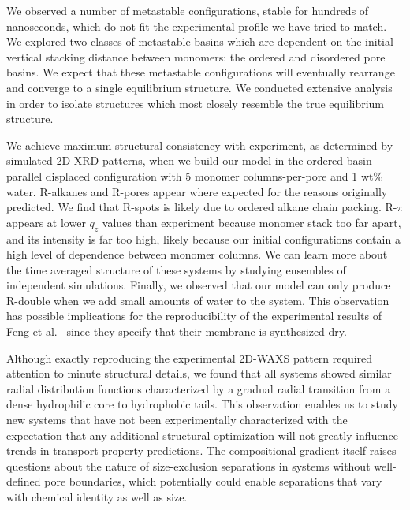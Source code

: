   We observed a number of metastable configurations, stable for hundreds of 
  nanoseconds, which do not fit the experimental profile we have tried to match. 
  We explored two classes of metastable basins which are dependent on the initial
  vertical stacking distance between monomers: the ordered and disordered pore basins.
  We expect that these metastable configurations will eventually rearrange and converge
  to a single equilibrium structure. We conducted extensive analysis in order to 
  isolate structures which most closely resemble the true equilibrium structure.

  We achieve maximum structural consistency with experiment, as determined by
  simulated 2D-XRD patterns, when we build our model in the ordered basin
  parallel displaced configuration with 5 monomer columns-per-pore and 1 wt\%
  water. R-alkanes and R-pores appear where expected for the reasons originally
  predicted. We find that R-spots is likely due to ordered alkane chain packing.
  R-$\pi$ appears at lower $q_z$ values than experiment because monomer stack too far
  apart, and its intensity is far too high, likely because our initial
  configurations contain a high level of dependence between monomer columns.
  We can learn more about the time averaged structure of these systems by studying
  ensembles of independent simulations. Finally, we observed that our model can 
  only produce R-double when we add small amounts of water to the system. This 
  observation has possible implications for the reproducibility of the experimental
  results of Feng et al.~\cite{feng_scalable_2014,feng_thin_2016} since they
  specify that their membrane is synthesized dry.  

  Although exactly reproducing the experimental 2D-WAXS pattern required
  attention to minute structural details, we found that all systems showed
  similar radial distribution functions characterized by a gradual radial
  transition from a dense hydrophilic core to hydrophobic tails. This observation
  enables us to study new systems that have not been experimentally characterized
  with the expectation that any additional structural optimization will not
  greatly influence trends in transport property predictions. The compositional
  gradient itself raises questions about the nature of size-exclusion separations
  in systems without well-defined pore boundaries, which potentially could enable
  separations that vary with chemical identity as well as size. 


